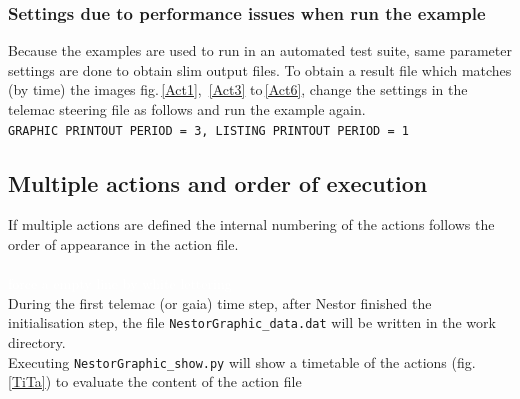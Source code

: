 \subsubsection{Settings due to performance issues when run the example}
Because the examples are used to run in an automated test suite, same parameter
settings are done to obtain slim output files.
To obtain a result file which matches (by time) the images fig.\,\ref{Act1}, \,\ref{Act3} to\,\ref{Act6}, change the settings in the telemac steering file
as follows and run the example again.
\\ \texttt{\small{GRAPHIC PRINTOUT PERIOD = 3,  LISTING PRINTOUT PERIOD = 1}}

\subsection{Multiple actions and order of execution}\label{ssec:E4OrderExc}
If multiple actions are defined the internal numbering of the actions follows the order of appearance in the action file.\\
\\
\textcolor{white}{force a empty line by white lettering}\\ %

During the first telemac (or gaia) time step, after Nestor finished the initialisation step,
the file \texttt{NestorGraphic\_data.dat} will be written in the work directory.\\
Executing \texttt{NestorGraphic\_show.py} will show a timetable of the actions (fig.\,\ref{TiTa})
to evaluate the content of the action file

